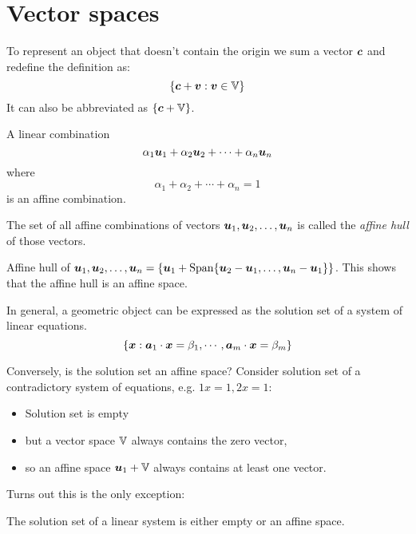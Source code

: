 
\section{Vector spaces}
To represent an object that doesn't contain the origin we sum a vector ${\bm{c}}$ and redefine the definition as:
\begin{equation*}
  \{ {\bm{c}} + {\bm{v}} : {\bm{v}} \in {\mathbb{V}} \}
\end{equation*}
It can also be abbreviated as $\{ {\bm{c}} + {\mathbb{V}} \}$.

\begin{definition}
  A linear combination
  \begin{equation*}
    \alpha_1{\bm{u}}_1 + \alpha_2{\bm{u}}_2 + \cdots + \alpha_n{\bm{u}}_n
  \end{equation*}
  where
  \begin{equation*}
    \alpha_1 + \alpha_2 + \cdots + \alpha_n = 1
  \end{equation*}
  is an affine combination.
\end{definition}

\begin{definition}
  The set of all affine combinations of vectors ${\bm{u}}_1, {\bm{u}}_2, \ldots, {\bm{u}}_n$ is called the \emph{affine hull} of those vectors.
\end{definition}

Affine hull of ${\bm{u}}_1, {\bm{u}}_2, \ldots, {\bm{u}}_n = \{ {\bm{u}}_1 + \mathrm{Span}\{ {\bm{u}}_2 - {\bm{u}}_1, \ldots, {\bm{u}}_n - {\bm{u}}_1 \} \}$. This shows that the affine hull is an affine space.

In general, a geometric object can be expressed as the solution set of a system of linear equations.
\begin{equation*}
  \{ {\bm{x}} : {\bm{a}}_1\cdot{\bm{x}} = \beta_1, \cdots, {\bm{a}}_m\cdot{\bm{x}} = \beta_m \}
\end{equation*}

Conversely, is the solution set an affine space?
Consider solution set of a contradictory system of equations, e.g. $1x = 1, 2x = 1$:
\begin{itemize}
\item Solution set is empty
\item but a vector space ${\mathbb{V}}$ always contains the zero vector,
\item so an affine space ${\bm{u}}_1 + {\mathbb{V}}$ always contains at least one vector.
\end{itemize}
Turns out this is the only exception:
\begin{theorem}
  The solution set of a linear system is either empty or an affine space.
\end{theorem}

